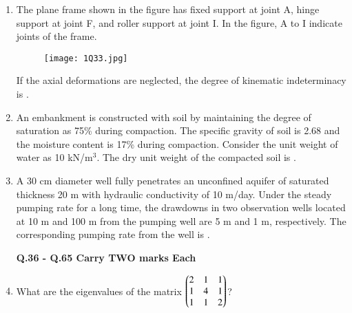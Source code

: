 \documentclass[journal,12pt,onecolumn]{article}
\theoremstyle{remark}
\begin{document}
\begin{enumerate}
    \hfill{}

    \item The plane frame shown in the figure  has fixed support at joint A, hinge support at joint F, and roller support at joint I. In the figure, A to I indicate joints of the frame.
    \begin{figure}[H]
        \centering
        \texttt{[image: 1Q33.jpg]}
        \caption{}
        \label{fig:q33}
    \end{figure}
    If the axial deformations are neglected, the degree of kinematic indeterminacy is \underline{\hspace{2cm}} .
    
    \hfill{}

    \item An embankment is constructed with soil by maintaining the degree of saturation as 75\% during compaction. The specific gravity of soil is 2.68 and the moisture content is 17\% during compaction. Consider the unit weight of water as 10 kN/m$^3$. The dry unit weight  of the compacted soil is \underline{\hspace{2cm}} .
    
    \hfill{}

    \item A 30 cm diameter well fully penetrates an unconfined aquifer of saturated thickness 20 m with hydraulic conductivity of 10 m/day. Under the steady pumping rate for a long time, the drawdowns in two observation wells located at 10 m and 100 m from the pumping well are 5 m and 1 m, respectively. The corresponding pumping rate  from the well is \underline{\hspace{2cm}} .
    
    \hfill{}

    \textbf{Q.36 - Q.65 Carry TWO marks Each}
    \item What are the eigenvalues of the matrix $\begin{pmatrix}2 & 1 & 1 \\ 1 & 4 & 1 \\ 1 & 1 & 2\end{pmatrix}$?
    
    \hfill{}
    \begin{enumerate}
    \end{enumerate}


\end{enumerate}
\end{document}
